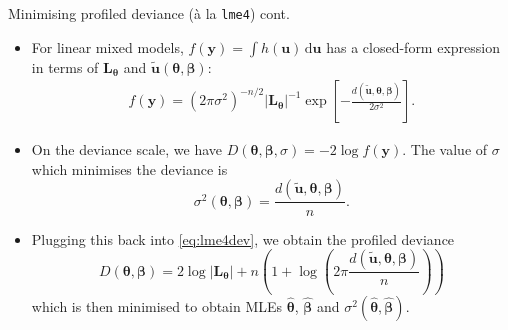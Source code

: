 \documentclass{beamer}\usepackage[]{graphicx}\usepackage[]{color}
\begin{document}
\begin{frame}{Minimising profiled deviance (à la \texttt{lme4}) cont.}
	\begin{itemize}
		\item For linear mixed models, $f(\mathbf y) = \int h(\mathbf u) \,\text{d}\mathbf u$ has a closed-form expression in terms of $\mathbf L_{\boldsymbol{\theta}}$ and $\tilde{\mathbf u}(\boldsymbol\theta, \boldsymbol\beta)$:
			\begin{align}\label{eq:lme4dev}
				f(\mathbf y) = (2\pi\sigma^2)^{-n/2} \vert \mathbf L_{\boldsymbol{\theta}} \vert^{-1} \exp \left[- \frac{d ( \tilde{\mathbf u}, \boldsymbol\theta, \boldsymbol\beta)}{2\sigma^2} \right].
			\end{align}
		\item On the deviance scale, we have $D(\boldsymbol\theta, \boldsymbol\beta, \sigma) = -2 \log f(\mathbf y)$. The value of $\sigma$ which minimises the deviance is
			\[
				\sigma^2(\boldsymbol\theta, \boldsymbol\beta) = \frac{d ( \tilde{\mathbf u}, \boldsymbol\theta, \boldsymbol\beta)}{n}.
			\]
		\item Plugging this back into \eqref{eq:lme4dev}, we obtain the profiled deviance
			\[
				D(\boldsymbol\theta, \boldsymbol\beta) = 2 \log \vert \mathbf L_{\boldsymbol{\theta}} \vert + n \left( 1 + \log \left(2\pi \frac{d ( \tilde{\mathbf u}, \boldsymbol\theta, \boldsymbol\beta)}{n} \right)\right)
			\]
			which is then minimised to obtain MLEs $\hat{\boldsymbol\theta}$, $\hat{\boldsymbol\beta}$ and $\sigma^2(\hat{\boldsymbol\theta}, \hat{\boldsymbol\beta})$.
	\end{itemize}
\end{frame}
\end{document}
